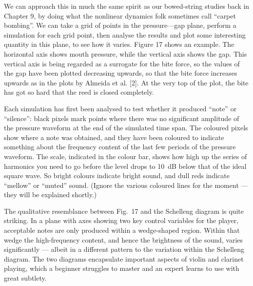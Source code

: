   We can approach this in much the same spirit as our bowed-string studies back 
  in Chapter 9, by doing what the nonlinear dynamics folk sometimes call 
  “carpet bombing”. We can take a grid of points in the pressure—gap plane, 
  perform a simulation for each grid point, then analyse the results and plot 
  some interesting quantity in this plane, to see how it varies. Figure 17 
  shows an example. The horizontal axis shows mouth pressure, while the 
  vertical axis shows the gap. This vertical axis is being regarded as a 
  surrogate for the bite force, so the values of the gap have been plotted 
  decreasing upwards, so that the bite force increases upwards as in the plots 
  by Almeida et al. [2]. At the very top of the plot, the bite has got so hard 
  that the reed is closed completely. 


  Each simulation has first been analysed to test whether it produced “note” or 
  “silence”: black pixels mark points where there was no significant amplitude 
  of the pressure waveform at the end of the simulated time span. The coloured 
  pixels show where a note was obtained, and they have been coloured to 
  indicate something about the frequency content of the last few periods of the 
  pressure waveform. The scale, indicated in the colour bar, shows how high up 
  the series of harmonics you need to go before the level drops to 10~dB below 
  that of the ideal square wave. So bright colours indicate bright sound, and 
  dull reds indicate “mellow” or “muted” sound. (Ignore the various coloured 
  lines for the moment --- they will be explained shortly.) 

  The qualitative resemblance between Fig.\ 17 and the Schelleng diagram is 
  quite striking. In a plane with axes showing two key control variables for 
  the player, acceptable notes are only produced within a wedge-shaped region. 
  Within that wedge the high-frequency content, and hence the brightness of the 
  sound, varies significantly — albeit in a different pattern to the variation 
  within the Schelleng diagram. The two diagrams encapsulate important aspects 
  of violin and clarinet playing, which a beginner struggles to master and an 
  expert learns to use with great subtlety. 

